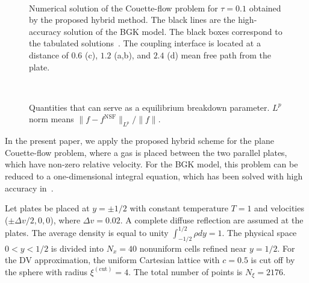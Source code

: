 \documentclass{aip-cp}
\makeatletter
\newenvironment{subfigures}
 {\begin{minipage}{\columnwidth}\def\@captype{figure}\centering}
 {\end{minipage}}
\makeatother
\begin{document}
\begin{figure}
    \begin{subfigures}
    \centering
    \\
    \end{subfigures}
    \caption{
        Numerical solution of the Couette-flow problem for $\tau=0.1$ obtained by the proposed hybrid method.
        The black lines are the high-accuracy solution of the BGK model.
        The black boxes correspond to the tabulated solutions~\cite{Luo2015, Luo2016}.
        The coupling interface is located at a distance of $0.6$ (c),
        $1.2$ (a,b), and $2.4$ (d) mean free path from the plate.
    }\label{fig:hybrid}
\end{figure}

\begin{figure}
    \begin{subfigures}
    \centering
    \\
    \end{subfigures}
    \caption{
        Quantities that can serve as a equilibrium breakdown parameter. \(L^p\) norm means \(\|f-f^{\mathrm{NSF}}\|_{L^p}/\|f\|\).
    }\label{fig:norms}
\end{figure}

In the present paper, we apply the proposed hybrid scheme for the plane Couette-flow problem,
where a gas is placed between the two parallel plates, which have non-zero relative velocity.
For the BGK model, this problem can be reduced to a one-dimensional integral equation,
which has been solved with high accuracy in~\cite{Luo2015, Luo2016}.

Let plates be placed at $y = \pm 1/2$ with constant temperature $T = 1$ and velocities ($\pm\Delta v/2,0,0$), where $\Delta v=0.02$.
A complete diffuse reflection are assumed at the plates.
The average density is equal to unity $\int_{-1/2}^{1/2}\rho dy=1$.
The physical space $0 < y < 1/2$ is divided into $N_x = 40$ nonuniform cells refined near $y = 1/2$.
For the DV approximation, the uniform Cartesian lattice with $c=0.5$ is cut off by the sphere with radius $\xi^{(\mathrm{cut})}=4$.
The total number of points is $N_\xi=2176$.
\end{document}
